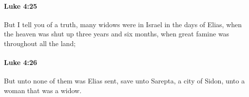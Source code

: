 		\paragraph{Luke 4:25} %
			\label{LUKE-4-25}

			But I tell you of a truth, many widows were in Israel in the days of Elias, when the heaven was shut up three years and six months, when great famine was throughout all the land;

			\begin{framed}
			\scriptsize
				\begin{compactdesc}
					\item[SBLG] 
				\end{compactdesc}
			\end{framed}

		\paragraph{Luke 4:26} %
			\label{LUKE-4-26}

			But unto none of them was Elias sent, save unto Sarepta, a city of Sidon, unto a woman that was a widow.

